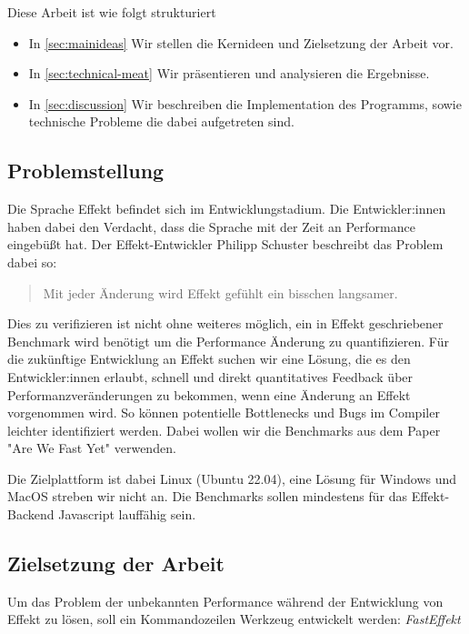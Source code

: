 Diese Arbeit ist wie folgt strukturiert
\begin{itemize}
    \item In \cref{sec:mainideas} Wir stellen die Kernideen und Zielsetzung der Arbeit vor.
    \item In \cref{sec:technical-meat} Wir präsentieren und analysieren die Ergebnisse.
    \item In \cref{sec:discussion} Wir beschreiben die Implementation des Programms, sowie technische Probleme die dabei aufgetreten sind.
\end{itemize}

\subsection{ Problemstellung }
Die Sprache Effekt befindet sich im Entwicklungstadium. Die Entwickler:innen haben dabei den Verdacht, dass die Sprache mit der Zeit an Performance eingebüßt hat. Der Effekt-Entwickler Philipp Schuster beschreibt das Problem dabei so:
\begin{center}
    \begin{quote}
        Mit jeder Änderung wird Effekt gefühlt ein bisschen langsamer.\cite{PhilippConvo}
    \end{quote}
\end{center}
Dies zu verifizieren ist nicht ohne weiteres möglich, ein in Effekt geschriebener Benchmark wird benötigt um die Performance Änderung zu quantifizieren.
Für die zukünftige Entwicklung an Effekt suchen wir eine Lösung, die es den Entwickler:innen erlaubt, schnell und direkt quantitatives Feedback über Performanzveränderungen zu bekommen, wenn eine Änderung an Effekt vorgenommen wird. So können potentielle Bottlenecks und Bugs im Compiler leichter identifiziert werden.
Dabei wollen wir die Benchmarks aus dem Paper "Are We Fast Yet" verwenden.

Die Zielplattform ist dabei Linux (Ubuntu 22.04), eine Lösung für Windows und MacOS streben wir nicht an.
Die Benchmarks sollen mindestens für das Effekt-Backend Javascript lauffähig sein.

\subsection{ Zielsetzung der Arbeit}

Um das Problem der unbekannten Performance während der Entwicklung von Effekt zu lösen, soll ein Kommandozeilen Werkzeug entwickelt werden: \textit{FastEffekt}

